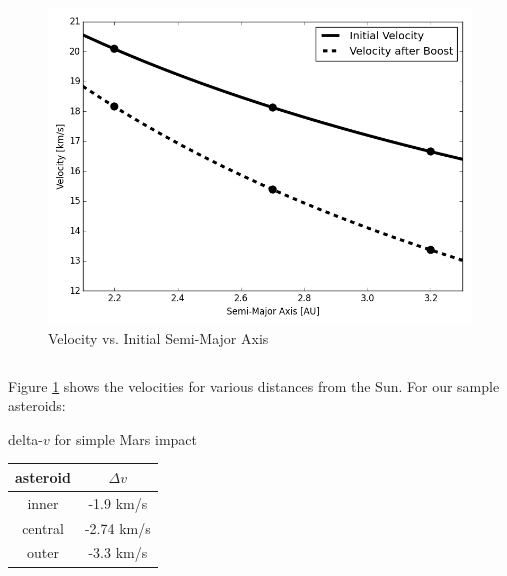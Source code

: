 \documentclass[a4paper]{article}
\begin{document}
	\begin{figure}[ht]
		\centering
		\includegraphics[scale=0.5]{velocity.png}
		\caption{Velocity vs. Initial Semi-Major Axis}
		\label{fig:vel1}
	\end{figure} \[\]
	
	Figure \ref{fig:vel1} shows the velocities for various distances from the Sun. For our sample asteroids:
	
	\begin{center}
		delta-$v$ for simple Mars impact
		
		\begin{tabular}{c|c}
			asteroid & $\Delta v$ \\ \hline
			inner      & -1.9 km/s \\ \hline
			central      & -2.74 km/s \\ \hline
			outer      & -3.3 km/s
		\end{tabular}
	\end{center}
	
\end{document}
